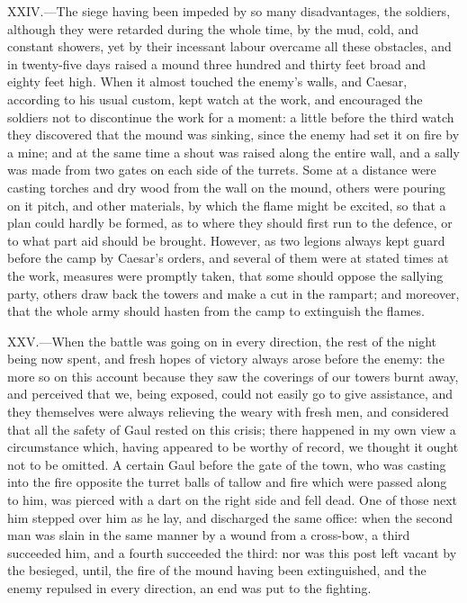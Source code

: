 XXIV.—The siege having been impeded by so many disadvantages, the
soldiers, although they were retarded during the whole time, by the mud,
cold, and constant showers, yet by their incessant labour overcame all
these obstacles, and in twenty-five days raised a mound three hundred
and thirty feet broad and eighty feet high. When it almost touched the
enemy's walls, and Caesar, according to his usual custom, kept watch at
the work, and encouraged the soldiers not to discontinue the work for a
moment: a little before the third watch they discovered that the mound
was sinking, since the enemy had set it on fire by a mine; and at the
same time a shout was raised along the entire wall, and a sally was made
from two gates on each side of the turrets. Some at a distance were
casting torches and dry wood from the wall on the mound, others were
pouring on it pitch, and other materials, by which the flame might be
excited, so that a plan could hardly be formed, as to where they should
first run to the defence, or to what part aid should be brought.
However, as two legions always kept guard before the camp by Caesar's
orders, and several of them were at stated times at the work, measures
were promptly taken, that some should oppose the sallying party, others
draw back the towers and make a cut in the rampart; and moreover, that
the whole army should hasten from the camp to extinguish the flames.

XXV.—When the battle was going on in every direction, the rest of the
night being now spent, and fresh hopes of victory always arose before
the enemy: the more so on this account because they saw the coverings of
our towers burnt away, and perceived that we, being exposed, could not
easily go to give assistance, and they themselves were always relieving
the weary with fresh men, and considered that all the safety of Gaul
rested on this crisis; there happened in my own view a circumstance
which, having appeared to be worthy of record, we thought it ought not
to be omitted. A certain Gaul before the gate of the town, who was
casting into the fire opposite the turret balls of tallow and fire which
were passed along to him, was pierced with a dart on the right side and
fell dead. One of those next him stepped over him as he lay, and
discharged the same office: when the second man was slain in the same
manner by a wound from a cross-bow, a third succeeded him, and a fourth
succeeded the third: nor was this post left vacant by the besieged,
until, the fire of the mound having been extinguished, and the enemy
repulsed in every direction, an end was put to the fighting.

